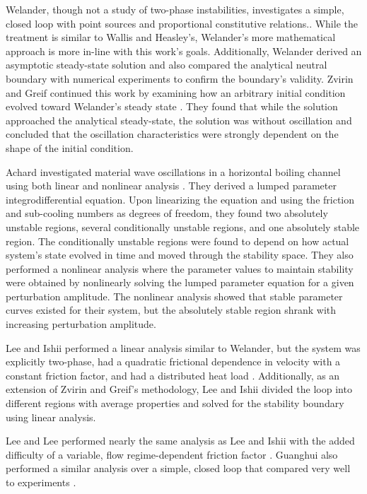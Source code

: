 Welander, though not a study of two-phase instabilities, investigates a simple, closed loop with point sources and proportional constitutive relations.\cite{welander_oscillatory_1967}.
While the treatment is similar to Wallis and Heasley's, Welander's more mathematical approach is more in-line with this work's goals.
Additionally, Welander derived an asymptotic steady-state solution and also compared the analytical neutral boundary with numerical experiments to confirm the boundary's validity.
Zvirin and Greif continued this work by examining how an arbitrary initial condition evolved toward Welander's steady state \cite{zvirin_transient_1979}.
They found that while the solution approached the analytical steady-state, the solution was without oscillation and concluded that the oscillation characteristics were strongly dependent on the shape of the initial condition.

Achard \etal investigated material wave oscillations in a horizontal boiling channel using both linear and nonlinear analysis \cite{achard_analysis_1985}.
They derived a lumped parameter integrodifferential equation.
Upon linearizing the equation and using the friction and sub-cooling numbers as degrees of freedom, they found two absolutely unstable regions, several conditionally unstable regions, and one absolutely stable region.
The conditionally unstable regions were found to depend on how actual system's state evolved in time and moved through the stability space.
They also performed a nonlinear analysis where the parameter values to maintain stability were obtained by nonlinearly solving the lumped parameter equation for a given perturbation amplitude.
The nonlinear analysis showed that stable parameter curves existed for their system, but the absolutely stable region shrank with increasing perturbation amplitude.

Lee and Ishii performed a linear analysis similar to Welander, but the system was explicitly two-phase, had a quadratic frictional dependence in velocity with a constant friction factor, and had a distributed heat load \cite{sang_yong_lee_thermally_1990}.
Additionally, as an extension of Zvirin and Greif's methodology, Lee and Ishii divided the loop into different regions with average properties and solved for the stability boundary using linear analysis.

Lee and Lee performed nearly the same analysis as Lee and Ishii with the added difficulty of a variable, flow regime-dependent friction factor \cite{lee_linear_1991}.
Guanghui \etal also performed a similar analysis over a simple, closed loop that compared very well to experiments \cite{guanghui_theoretical_2002}.


